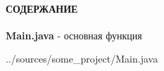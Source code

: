 \documentclass[12pt, a4paper, simple]{eskdtext}
\begin{document}


\thispagestyle{plain}   %
\pagestyle{plain}       %
\hspace{0pt}

\paragraph{СОДЕРЖАНИЕ} \hspace{0pt}

\hspace{0pt}

\textbf{Main.java} - основная функция

\newpage
    

{../sources/some_project/Main.java}

\newpage
\end{document}

